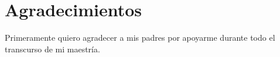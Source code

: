 
\cleardoublepage
\setcounter{savepage}{\thepage}
\begin{abstractpage}

\end{abstractpage}

% 

\cleardoublepage

\section*{Agradecimientos}

Primeramente quiero agradecer a mis padres por apoyarme durante todo
el transcurso de mi maestría.

